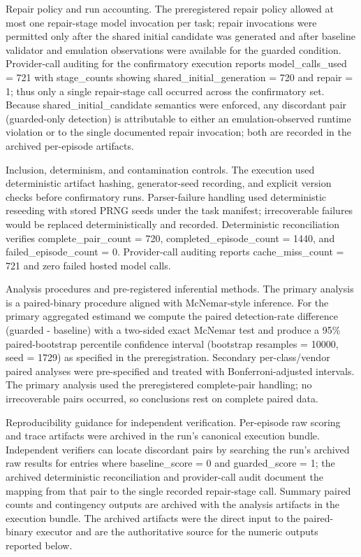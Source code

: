 \documentclass[conference]{IEEEtran}
\begin{document}
Repair policy and run accounting. The preregistered repair policy allowed at most one repair-stage model invocation per task; repair invocations were permitted only after the shared initial candidate was generated and after baseline validator and emulation observations were available for the guarded condition. Provider-call auditing for the confirmatory execution reports model\_calls\_used = 721 with stage\_counts showing shared\_initial\_generation = 720 and repair = 1; thus only a single repair-stage call occurred across the confirmatory set. Because shared\_initial\_candidate semantics were enforced, any discordant pair (guarded-only detection) is attributable to either an emulation-observed runtime violation or to the single documented repair invocation; both are recorded in the archived per-episode artifacts.

Inclusion, determinism, and contamination controls. The execution used deterministic artifact hashing, generator-seed recording, and explicit version checks before confirmatory runs. Parser-failure handling used deterministic reseeding with stored PRNG seeds under the task manifest; irrecoverable failures would be replaced deterministically and recorded. Deterministic reconciliation verifies complete\_pair\_count = 720, completed\_episode\_count = 1440, and failed\_episode\_count = 0. Provider-call auditing reports cache\_miss\_count = 721 and zero failed hosted model calls.

Analysis procedures and pre-registered inferential methods. The primary analysis is a paired-binary procedure aligned with McNemar-style inference. For the primary aggregated estimand we compute the paired detection-rate difference (guarded - baseline) with a two-sided exact McNemar test and produce a 95\% paired-bootstrap percentile confidence interval (bootstrap resamples = 10000, seed = 1729) as specified in the preregistration. Secondary per-class/vendor paired analyses were pre-specified and treated with Bonferroni-adjusted intervals. The primary analysis used the preregistered complete-pair handling; no irrecoverable pairs occurred, so conclusions rest on complete paired data.

Reproducibility guidance for independent verification. Per-episode raw scoring and trace artifacts were archived in the run's canonical execution bundle. Independent verifiers can locate discordant pairs by searching the run's archived raw results for entries where baseline\_score = 0 and guarded\_score = 1; the archived deterministic reconciliation and provider-call audit document the mapping from that pair to the single recorded repair-stage call. Summary paired counts and contingency outputs are archived with the analysis artifacts in the execution bundle. The archived artifacts were the direct input to the paired-binary executor and are the authoritative source for the numeric outputs reported below.
\end{document}
